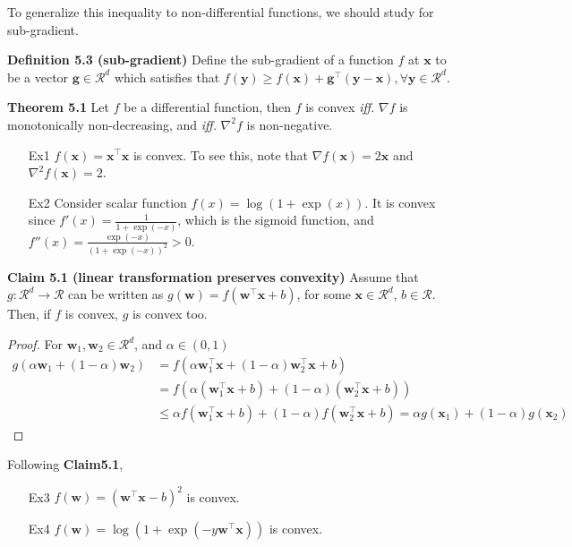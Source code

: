 \documentclass{article}
\newtheorem*{proof}{Proof}
\begin{document}
	To generalize this inequality to non-differential functions, we should study for sub-gradient. 
	
	\textbf{Definition 5.3 (sub-gradient)} Define the sub-gradient of a function $f$ at $\mathbf{x}$ to be a vector $\mathbf{g}\in\mathcal{R}^d$ which satisfies that $f(\mathbf{y}) \geq f(\mathbf{x}) + \mathbf{g}^\top (\mathbf{y}-\mathbf{x}), \forall \mathbf{y}\in\mathcal{R}^d$.
	
	\textbf{Theorem 5.1} Let $f$ be a differential function, then $f$ is convex \textit{iff.} $\nabla f$ is monotonically non-decreasing, and \textit{iff.} $\nabla^2 f$ is non-negative.

	\begin{itemize}
	\item[Ex1] $f(\mathbf{x})=\mathbf{x}^\top\mathbf{x}$ is convex. To see this, note that $\nabla f(\mathbf{x})=2\mathbf{x}$ and $\nabla^2 f(\mathbf{x}) = 2$.
	\item[Ex2] Consider scalar function $f(x)=\log(1+\exp(x))$. It is convex since $f'(x)=\frac{1}{1+\exp(-x)}$, which is the sigmoid function, and $f''(x)=\frac{\exp(-x)}{(1+\exp(-x))^2}>0$.
	\end{itemize}
	
	\textbf{Claim 5.1 (linear transformation preserves convexity)} Assume that $g:\mathcal{R}^d\rightarrow\mathcal{R}$ can be written as $g(\mathbf{w}) = f(\mathbf{w}^\top \mathbf{x} + b)$, for some $\mathbf{x}\in\mathcal{R}^d$, $b\in\mathcal{R}$. Then, if $f$ is convex, $g$ is convex too.
	
	\begin{proof} For $\mathbf{w}_1, \mathbf{w}_2 \in \mathcal{R}^d$, and $\alpha \in (0,1)$
	\begin{equation*}
	\begin{split}
	g(\alpha \mathbf{w}_1 + (1-\alpha) \mathbf{w}_2) &= f(\alpha \mathbf{w}_1^\top \mathbf{x} + (1-\alpha) \mathbf{w}_2^\top \mathbf{x} + b) \\
	&= f(\alpha (\mathbf{w}_1^\top \mathbf{x}+b) + (1-\alpha) (\mathbf{w}_2^\top \mathbf{x} + b))  \\
	&\leq \alpha  f(\mathbf{w}_1^\top \mathbf{x}+b) + (1-\alpha) f (\mathbf{w}_2^\top \mathbf{x} + b)
	= \alpha g(\mathbf{x}_1) + (1-\alpha) g(\mathbf{x}_2)
	\end{split}
	\end{equation*}
	\end{proof}
	
	Following \textbf{Claim5.1}, 
	\begin{itemize}
	\item[Ex3] $f(\mathbf{w})=(\mathbf{w}^\top \mathbf{x} - b)^2$ is convex.
	\item[Ex4] $f(\mathbf{w})=\log(1+\exp(-y\mathbf{w}^\top \mathbf{x}))$ is convex.
	\end{itemize}
	
\end{document}
